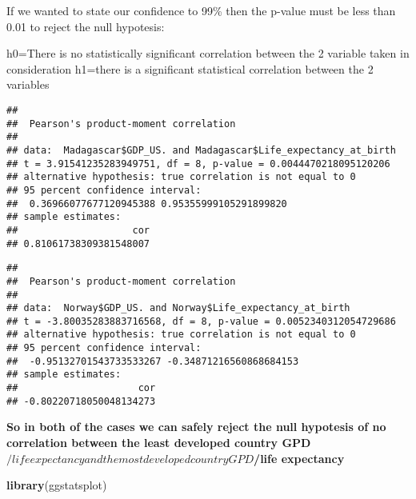 \documentclass[
]{article}
\newenvironment{Shaded}{\begin{snugshade}}{\end{snugshade}}
\newcommand{\FunctionTok}[1]{\textcolor[rgb]{0.13,0.29,0.53}{\textbf{#1}}}
\newcommand{\NormalTok}[1]{#1}
\newcommand{\SpecialCharTok}[1]{\textcolor[rgb]{0.81,0.36,0.00}{\textbf{#1}}}
\begin{document}
If we wanted to state our confidence to 99\% then the p-value must be
less than 0.01 to reject the null hypotesis:

h0=There is no statistically significant correlation between the 2
variable taken in consideration h1=there is a significant statistical
correlation between the 2 variables

\begin{Shaded}
\end{Shaded}

\begin{verbatim}
## 
##  Pearson's product-moment correlation
## 
## data:  Madagascar$GDP_US. and Madagascar$Life_expectancy_at_birth
## t = 3.91541235283949751, df = 8, p-value = 0.0044470218095120206
## alternative hypothesis: true correlation is not equal to 0
## 95 percent confidence interval:
##  0.36966077677120945388 0.95355999105291899820
## sample estimates:
##                    cor 
## 0.81061738309381548007
\end{verbatim}

\begin{Shaded}
\end{Shaded}

\begin{verbatim}
## 
##  Pearson's product-moment correlation
## 
## data:  Norway$GDP_US. and Norway$Life_expectancy_at_birth
## t = -3.80035283883716568, df = 8, p-value = 0.0052340312054729686
## alternative hypothesis: true correlation is not equal to 0
## 95 percent confidence interval:
##  -0.95132701543733533267 -0.34871216560868684153
## sample estimates:
##                     cor 
## -0.80220718050048134273
\end{verbatim}

\textbf{So in both of the cases we can safely reject the null hypotesis
of no correlation between the least developed country
GPD\(/life expectancy and the most developed country GPD\)/life
expectancy}

\begin{Shaded}
\begin{Highlighting}[]
\FunctionTok{library}\NormalTok{(ggstatsplot)}
\end{Highlighting}
\end{Shaded}
\end{document}
